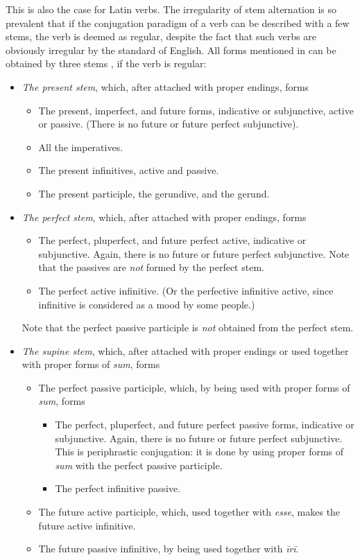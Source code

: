\documentclass{article}
\newcommand*{\citesec}[1]{\S~{#1}}
\newcommand*{\corpus}[1]{\emph{#1}}
\begin{document}
This is also the case for Latin verbs.
The irregularity of stem alternation is so prevalent
that if the conjugation paradigm of a verb can be described with a few stems,
the verb is deemed as regular, 
despite the fact that such verbs are obviously irregular by the standard of English.
All forms mentioned in 
can be obtained by three stems \citep[\citesec{164}]{allen1903allen},
if the verb is regular:
\begin{itemize}
    \item \emph{The present stem}, which, after attached with proper endings, forms
    \begin{itemize}
        \item The present, imperfect, and future forms, indicative or subjunctive,
        active or passive. (There is no future or future perfect subjunctive).
        \item All the imperatives.
        \item The present infinitives, active and passive.
        \item The present participle, the gerundive, and the gerund.
    \end{itemize}
    \item \emph{The perfect stem}, which, after attached with proper endings, forms 
    \begin{itemize}
        \item The perfect, pluperfect, and future perfect active, indicative or subjunctive.
        Again, there is no future or future perfect subjunctive.
        Note that the passives are \emph{not} formed by the perfect stem.
        \item The perfect active infinitive. 
        (Or the perfective infinitive active, since infinitive is considered as a mood by some people.)
    \end{itemize}
    Note that the perfect passive participle is \emph{not} obtained from the perfect stem.
    \item \emph{The supine stem}, 
    which, after attached with proper endings or used together with proper forms of \corpus{sum},
    forms 
    \begin{itemize}
        \item The perfect passive participle, which, by being used with proper forms of \corpus{sum}, forms
        \begin{itemize}
            \item The perfect, pluperfect, and future perfect passive forms, indicative or subjunctive.
            Again, there is no future or future perfect subjunctive.
            This is periphrastic conjugation: it is done by using proper forms of \corpus{sum}
            with the perfect passive participle.
            \item The perfect infinitive passive.
        \end{itemize}
        \item The future active participle, which, used together with \corpus{esse},
        makes the future active infinitive.
        \item The future passive infinitive, by being used together with \corpus{īrī}.
    \end{itemize}
\end{itemize}
\end{document}
